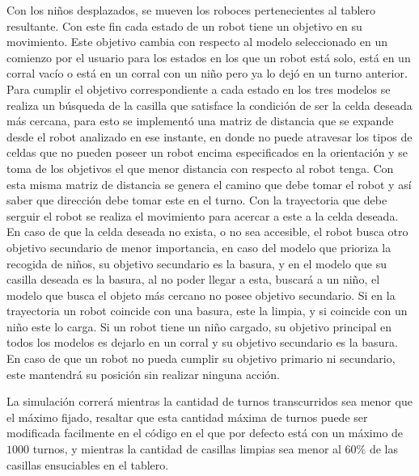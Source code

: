 \documentclass[titlepage,11pt]{scrartcl}
\begin{document}
Con los niños desplazados, se mueven los roboces pertenecientes al tablero resultante. Con este fin cada estado de un robot tiene un objetivo en su movimiento. Este objetivo cambia con respecto al modelo seleccionado en un comienzo por el usuario para los estados en los que un robot está solo, está en un corral vacío o está en un corral con un niño pero ya lo dejó en un turno anterior. Para cumplir el objetivo correspondiente a cada estado en los tres modelos se realiza un búsqueda de la casilla que satisface la condición de ser la celda deseada más cercana, para esto se implementó una matriz de distancia que se expande desde el robot analizado en ese instante, en donde no puede atravesar los tipos de celdas que no pueden poseer un robot encima especificados en la orientación y se toma de los objetivos el que menor distancia con respecto al robot tenga. Con esta misma matriz de distancia se genera el camino que debe tomar el robot y así saber que dirección debe tomar este en el turno. Con la trayectoria que debe serguir el robot se realiza el movimiento para acercar a este a la celda deseada. En caso de que la celda deseada no exista, o no sea accesible, el robot busca otro objetivo secundario de menor importancia, en caso del modelo que prioriza la recogida de niños, su objetivo secundario es la basura, y en el modelo que su casilla deseada es la basura, al no poder llegar a esta, buscará a un niño, el modelo que busca el objeto más cercano no posee objetivo secundario. Si en la trayectoria un robot coincide con una basura, este la limpia, y si coincide con un niño este lo carga. Si un robot tiene un niño cargado, su objetivo principal en todos los modelos es dejarlo en un corral y su objetivo secundario es la basura. En caso de que un robot no pueda cumplir su objetivo primario ni secundario, este mantendrá su posición sin realizar ninguna acción.

La simulación correrá mientras la cantidad de turnos transcurridos sea menor que el máximo fijado, resaltar que esta cantidad máxima de turnos puede ser modificada facilmente en el código en el que por defecto está con un máximo de $1000$ turnos, y mientras la cantidad de casillas limpias sea menor al 60\% de las casillas ensuciables en el tablero.
\end{document}
